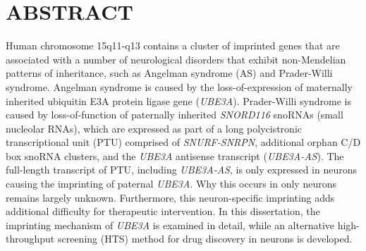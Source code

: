 %
%
%

\chapter*{ABSTRACT}

\pagestyle{plain} %
\setcounter{page}{2}

\indent Human chromosome 15q11-q13 contains a cluster of imprinted genes that are associated with a number of neurological disorders that exhibit non-Mendelian patterns of inheritance, such as Angelman syndrome (AS) and Prader-Willi syndrome. Angelman syndrome is caused by the loss-of-expression of maternally inherited ubiquitin E3A protein ligase gene (\textit{UBE3A}). Prader-Willi syndrome is caused by loss-of-function of paternally inherited \textit{SNORD116} snoRNAs (small nucleolar RNAs), which are expressed as part of a long polycistronic transcriptional unit (PTU) comprised of \textit{SNURF-SNRPN}, additional orphan C/D box snoRNA clusters, and the \textit{UBE3A} antisense transcript (\textit{UBE3A-AS}). The full-length transcript of PTU, including \textit{UBE3A-AS}, is only expressed in neurons causing the imprinting of paternal \textit{UBE3A}. Why this occurs in only neurons remains largely unknown. Furthermore, this neuron-specific imprinting adds additional difficulty for therapeutic intervention. In this dissertation, the imprinting mechanism of \textit{UBE3A} is examined in detail, while an alternative high-throughput screening (HTS) method for drug discovery in neurons is developed.

